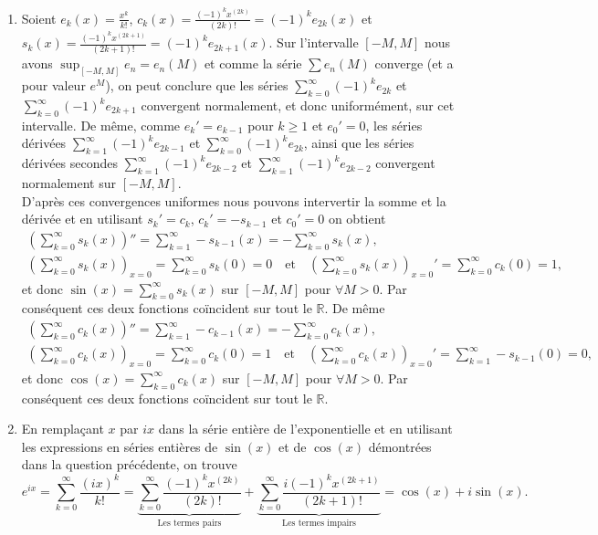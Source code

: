 \documentclass[a4paper,11pt,reqno]{amsart}
\begin{document}
\begin{solution}

\begin{enumerate}
  \item Soient $e_{k}(x) = \frac{x^{k}}{k!}$, $c_{k}(x)=\frac{(-1)^{k}x^{(2k)}}{(2k)!} = (-1)^{k}e_{2k}(x)$ et $s_{k}(x)=\frac{(-1)^{k}x^{(2k+1)}}{(2k+1)!} = (-1)^{k}e_{2k+1}(x)$. Sur l'intervalle $[-M,M]$ nous avons $\sup_{[-M,M]}e_{n} = e_{n}(M)$ et comme la série $\sum e_{n}(M)$ converge (et a pour valeur $e^{M}$), on peut conclure que les séries $\sum_{k=0}^{\infty}(-1)^{k}e_{2k}$ et $\sum_{k=0}^{\infty}(-1)^{k}e_{2k+1}$ convergent normalement, et donc uniformément, sur cet intervalle. De même, comme $e_k'=e_{k-1}$ pour $k\geq1$ et $e_0'=0$, les séries dérivées $\sum_{k=1}^{\infty}(-1)^{k}e_{2k-1}$ et $\sum_{k=0}^{\infty}(-1)^{k}e_{2k}$, ainsi que les séries dérivées secondes $\sum_{k=1}^{\infty}(-1)^{k}e_{2k-2}$ et $\sum_{k=1}^{\infty}(-1)^{k}e_{2k-2}$ convergent normalement sur $[-M,M]$.\\
  D'après ces convergences uniformes nous pouvons intervertir la somme et la dérivée et en utilisant $s_{k}'=c_{k}$, $c_{k}'=-s_{k-1}$ et $c_{0}'=0$ on obtient
  \begin{gather*}
    \left( \sum_{k=0}^{\infty}s_{k}(x) \right)'' = \sum_{k=1}^{\infty}-s_{k-1}(x) = -\sum_{k=0}^{\infty}s_{k}(x)\text{,}\\
    \left( \sum_{k=0}^{\infty}s_{k}(x) \right)_{x=0} = \sum_{k=0}^{\infty}s_{k}(0)=0\quad\text{et}\quad
    \left( \sum_{k=0}^{\infty}s_{k}(x) \right)_{x=0}' = \sum_{k=0}^{\infty}c_{k}(0)= 1\text{,}
  \end{gather*}
  et donc $\sin(x)=\sum_{k=0}^{\infty}s_{k}(x)$ sur $[-M,M]$ pour $\forall M > 0$. Par conséquent ces deux fonctions coïncident sur tout le $\mathbb{R}$. De même
  \begin{gather*}
    \left( \sum_{k=0}^{\infty}c_{k}(x) \right)'' = \sum_{k=1}^{\infty}-c_{k-1}(x) = -\sum_{k=0}^{\infty}c_{k}(x)\text{,}\\
    \left( \sum_{k=0}^{\infty}c_{k}(x) \right)_{x=0} = \sum_{k=0}^{\infty}c_k(0)= 1\quad\text{et}\quad
    \left( \sum_{k=0}^{\infty}c_{k}(x) \right)_{x=0}' = \sum_{k=1}^{\infty}-s_{k-1}(0)=0\text{,}
  \end{gather*}
  et donc $\cos(x)=\sum_{k=0}^{\infty}c_{k}(x)$ sur $[-M,M]$ pour $\forall M > 0$. Par conséquent ces deux fonctions coïncident sur tout le $\mathbb{R}$.
  \item En remplaçant $x$ par $ix$ dans la série entière de l'exponentielle et en utilisant les expressions en séries entières de $\sin(x)$ et de $\cos(x)$ démontrées dans la question précédente, on trouve
  $$
    e^{ix} = \sum_{k=0}^{\infty}\frac{(ix)^{k}}{k!} = \underbrace{\sum_{k=0}^{\infty}\frac{(-1)^k x^{(2k)}}{(2k)!}}_{\text{Les termes pairs}} + \underbrace{\sum_{k=0}^{\infty}\frac{i(-1)^k x^{(2k+1)}}{(2k+1)!}}_{\text{Les termes impairs}} = \cos(x) + i\sin(x).
  $$
\end{enumerate}

\end{solution}
\end{document}

